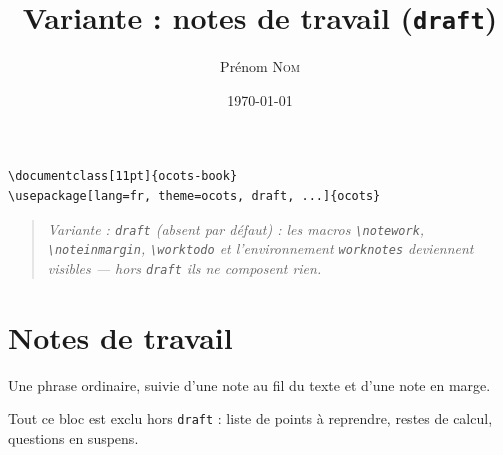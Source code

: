 \documentclass[11pt]{ocots-book}
\title{Variante : notes de travail (\texttt{draft})}
\author{Prénom \textsc{Nom}}
\date{\today}
\newcommand{\ocotsvariantnote}[1]{\begin{quote}\itshape Variante : #1\end{quote}}
\begin{document}
\begin{lstlisting}
\documentclass[11pt]{ocots-book}
\usepackage[lang=fr, theme=ocots, draft, ...]{ocots}
\end{lstlisting}
\ocotsvariantnote{\texttt{draft} (absent par défaut) : les macros
\texttt{\textbackslash notework}, \texttt{\textbackslash noteinmargin},
\texttt{\textbackslash worktodo} et l'environnement \texttt{worknotes}
deviennent visibles — hors \texttt{draft} ils ne composent rien.}

\ocotscollectsolutions

\ocotsprintsolutions

\section{Notes de travail}

Une phrase ordinaire, suivie d'une note au fil du texte  et d'une note en
marge.


\begin{worknotes}
    Tout ce bloc est exclu hors \texttt{draft} : liste de points à reprendre,
    restes de calcul, questions en suspens.
\end{worknotes}
\end{document}
